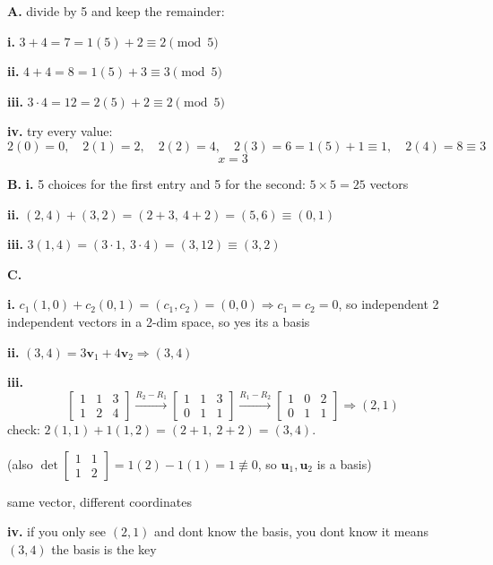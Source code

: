 \documentclass{article}
\begin{document}
\textbf{A.}
divide by 5 and keep the remainder:

\textbf{i.} $3 + 4 = 7 = 1(5) + 2 \equiv \boxed{2} \pmod 5$

\textbf{ii.} $4 + 4 = 8 = 1(5) + 3 \equiv \boxed{3} \pmod 5$

\textbf{iii.} $3 \cdot 4 = 12 = 2(5) + 2 \equiv \boxed{2} \pmod 5$

\textbf{iv.} try every value:
\[
2(0) = 0,\quad 2(1) = 2,\quad 2(2) = 4,\quad 2(3) = 6 = 1(5) + 1 \equiv 1,\quad 2(4) = 8 \equiv 3
\]
\[
\boxed{x = 3}
\]

\textbf{B.}
\textbf{i.} 5 choices for the first entry and 5 for the second: $5 \times 5 = \boxed{25}$ vectors

\textbf{ii.} $(2,4) + (3,2) = (2 + 3,\ 4 + 2) = (5, 6) \equiv \boxed{(0,1)}$

\textbf{iii.} $3(1,4) = (3 \cdot 1,\ 3 \cdot 4) = (3, 12) \equiv \boxed{(3,2)}$

\textbf{C.}

\textbf{i.} $c_1(1,0) + c_2(0,1) = (c_1, c_2) = (0,0) \Rightarrow c_1 = c_2 = 0$, so independent
2 independent vectors in a 2-dim space, so yes its a basis

\textbf{ii.} $(3,4) = 3\mathbf{v}_1 + 4\mathbf{v}_2 \Rightarrow \boxed{(3,4)}$

\textbf{iii.}
\[
\left[\begin{array}{cc|c} 1 & 1 & 3 \\ 1 & 2 & 4 \end{array}\right]
\xrightarrow{R_2 - R_1}
\left[\begin{array}{cc|c} 1 & 1 & 3 \\ 0 & 1 & 1 \end{array}\right]
\xrightarrow{R_1 - R_2}
\left[\begin{array}{cc|c} 1 & 0 & 2 \\ 0 & 1 & 1 \end{array}\right]
\Rightarrow \boxed{(2,1)}
\]
check: $2(1,1) + 1(1,2) = (2 + 1,\ 2 + 2) = (3,4)$. \checkmark

(also $\det\begin{bmatrix}1&1\\1&2\end{bmatrix} = 1(2) - 1(1) = 1 \not\equiv 0$, so $\mathbf{u}_1, \mathbf{u}_2$ is a basis)

same vector, different coordinates

\textbf{iv.} if you only see $(2,1)$ and dont know the basis, you dont know it means $(3,4)$ the basis is the key
\end{document}
